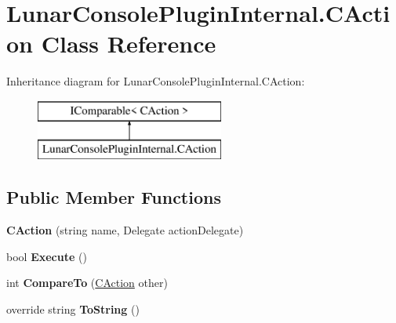 \hypertarget{class_lunar_console_plugin_internal_1_1_c_action}{}\section{Lunar\+Console\+Plugin\+Internal.\+C\+Action Class Reference}
\label{class_lunar_console_plugin_internal_1_1_c_action}
Inheritance diagram for Lunar\+Console\+Plugin\+Internal.\+C\+Action\+:\begin{figure}[H]
\begin{center}
\leavevmode
\includegraphics[height=2.000000cm]{class_lunar_console_plugin_internal_1_1_c_action}
\end{center}
\end{figure}
\subsection*{Public Member Functions}
\begin{DoxyCompactItemize}
\item 
\mbox{\label{class_lunar_console_plugin_internal_1_1_c_action_a799d3c81fb15f40dc9846c3afbbc107b}} 
{\bfseries C\+Action} (string name, Delegate action\+Delegate)
\item 
\mbox{\label{class_lunar_console_plugin_internal_1_1_c_action_a9521f0f1141e56f824c6a73a421f68f9}} 
bool {\bfseries Execute} ()
\item 
\mbox{\label{class_lunar_console_plugin_internal_1_1_c_action_a0b7dbfb6f8a0f068784548dc3d86053c}} 
int {\bfseries Compare\+To} (\mbox{\hyperlink{class_lunar_console_plugin_internal_1_1_c_action}{C\+Action}} other)
\item 
\mbox{\label{class_lunar_console_plugin_internal_1_1_c_action_af217e08abe4b4f01dfb87ac19a56e997}} 
override string {\bfseries To\+String} ()
\end{DoxyCompactItemize}
